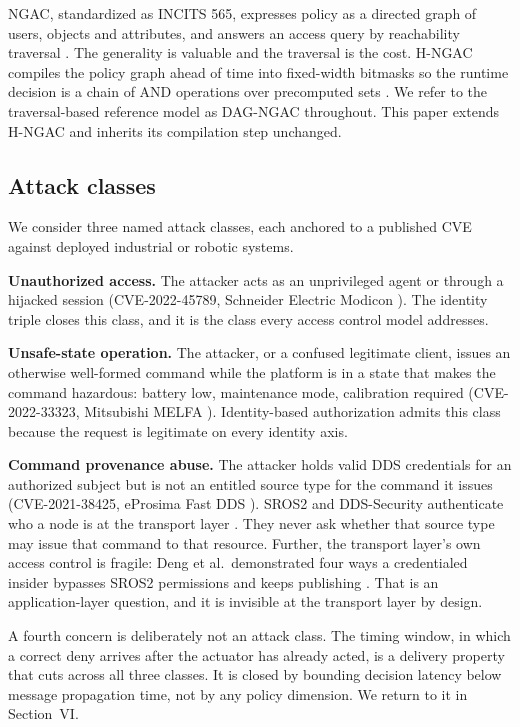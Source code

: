 \documentclass[conference]{IEEEtran}
\begin{document}
NGAC, standardized as INCITS 565, expresses policy as a directed graph of users, objects and attributes, and answers an access query by reachability traversal \cite{incits565, ferraiolo2011policymachine}. The generality is valuable and the traversal is the cost. H-NGAC compiles the policy graph ahead of time into fixed-width bitmasks so the runtime decision is a chain of AND operations over precomputed sets \cite{karim2026dcas}. We refer to the traversal-based reference model as DAG-NGAC throughout. This paper extends H-NGAC and inherits its compilation step unchanged.

\subsection{Attack classes}

We consider three named attack classes, each anchored to a published CVE against deployed industrial or robotic systems.

\textbf{Unauthorized access.} The attacker acts as an unprivileged agent or through a hijacked session (CVE-2022-45789, Schneider Electric Modicon \cite{cve202245789}). The identity triple closes this class, and it is the class every access control model addresses.

\textbf{Unsafe-state operation.} The attacker, or a confused legitimate client, issues an otherwise well-formed command while the platform is in a state that makes the command hazardous: battery low, maintenance mode, calibration required (CVE-2022-33323, Mitsubishi MELFA \cite{cve202233323}). Identity-based authorization admits this class because the request is legitimate on every identity axis.

\textbf{Command provenance abuse.} The attacker holds valid DDS credentials for an authorized subject but is not an entitled source type for the command it issues (CVE-2021-38425, eProsima Fast DDS \cite{cve202138425}). SROS2 and DDS-Security authenticate who a node is at the transport layer \cite{mayoralvilches2022sros2, omgddssec}. They never ask whether that source type may issue that command to that resource. Further, the transport layer's own access control is fragile: Deng et al.\ demonstrated four ways a credentialed insider bypasses SROS2 permissions and keeps publishing \cite{deng2022insecurity}. That is an application-layer question, and it is invisible at the transport layer by design.

A fourth concern is deliberately not an attack class. The timing window, in which a correct deny arrives after the actuator has already acted, is a delivery property that cuts across all three classes. It is closed by bounding decision latency below message propagation time, not by any policy dimension. We return to it in Section~VI.
\end{document}
